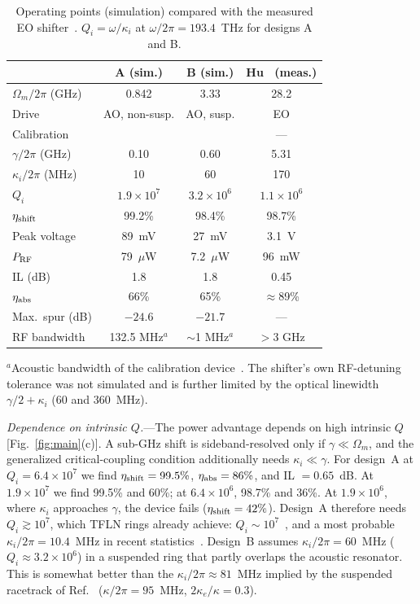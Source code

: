 \documentclass[aps,prl,reprint,superscriptaddress,amsmath,amssymb,floatfix]{revtex4-2}
\newcommand{\etash}{\eta_{\rm shift}}
\newcommand{\etaabs}{\eta_{\rm abs}}
\begin{document}
\begin{table}[b]
\caption{Operating points (simulation) compared with the measured EO shifter~\cite{Hu2021}. $Q_i=\omega/\kappa_i$ at $\omega/2\pi=193.4$~THz for designs A and B.}
\label{tab:main}
\begin{ruledtabular}
\small
\begin{tabular}{lccc}
 & A (sim.) & B (sim.) & Hu~\cite{Hu2021} (meas.)\\
\hline
$\Omega_m/2\pi$ (GHz) & 0.842 & 3.33 & 28.2\\
Drive & AO, non-susp. & AO, susp. & EO\\
Calibration & \cite{Ni2026} & \cite{Shao2019} & ---\\
$\gamma/2\pi$ (GHz) & 0.10 & 0.60 & 5.31\\
$\kappa_i/2\pi$ (MHz) & 10 & 60 & 170\\
$Q_i$ & $1.9\times10^7$ & $3.2\times10^6$ & $1.1\times10^6$\\
$\etash$ & 99.2\% & 98.4\% & 98.7\%\\
Peak voltage & 89~mV & 27~mV & 3.1~V\\
$P_{\rm RF}$ & 79~$\mu$W & 7.2~$\mu$W & 96~mW\\
IL (dB) & 1.8 & 1.8 & 0.45\\
$\etaabs$ & 66\% & 65\% & $\approx$89\%\\
Max.\ spur (dB) & $-24.6$ & $-21.7$ & ---\\
RF bandwidth & 132.5 MHz$^{a}$ & $\sim$1 MHz$^{a}$ & $>$3 GHz\\
\end{tabular}
\end{ruledtabular}
\raggedright\footnotesize $^{a}$Acoustic bandwidth of the calibration device~\cite{Ni2026,Shao2019}. The shifter's own RF-detuning tolerance was not simulated and is further limited by the optical linewidth $\gamma/2+\kappa_i$ (60 and 360~MHz).
\end{table}

\emph{Dependence on intrinsic $Q$.}---The power advantage depends on high intrinsic $Q$ [Fig.~\ref{fig:main}(c)]. A sub-GHz shift is sideband-resolved only if $\gamma\ll\Omega_m$, and the generalized critical-coupling condition additionally needs $\kappa_i\ll\gamma$. For design~A at $Q_i=6.4\times10^7$ we find $\etash=99.5\%$, $\etaabs=86\%$, and IL $=0.65$~dB. At $1.9\times10^7$ we find 99.5\% and 60\%; at $6.4\times10^6$, 98.7\% and 36\%. At $1.9\times10^6$, where $\kappa_i$ approaches $\gamma$, the device fails ($\etash=42\%$). Design~A therefore needs $Q_i\gtrsim10^7$, which TFLN rings already achieve: $Q_i\sim10^7$~\cite{Zhang2017}, and a most probable $\kappa_i/2\pi=10.4$~MHz in recent statistics~\cite{Zhu2026loss}. Design~B assumes $\kappa_i/2\pi=60$~MHz ($Q_i\approx3.2\times10^6$) in a suspended ring that partly overlaps the acoustic resonator. This is somewhat better than the $\kappa_i/2\pi\approx81$~MHz implied by the suspended racetrack of Ref.~\cite{Shao2019} ($\kappa/2\pi=95$~MHz, $2\kappa_e/\kappa=0.3$).
\end{document}
